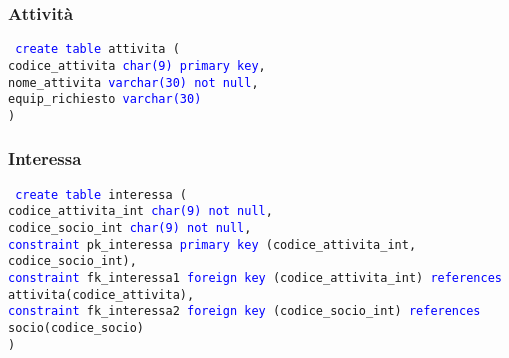 \documentclass{article}
\begin{document}
    \subsubsection{Attività}
    \begin{flushleft}
        \texttt{
        \textcolor{blue}{create table} attivita ( \\
        \hspace*{2em} codice\_attivita \hspace*{2em} \textcolor{blue}{char(9)} \hspace*{4em} \textcolor{blue}{primary key}, \\
        \hspace*{2em} nome\_attivita \hspace*{2.9em} \textcolor{blue}{varchar(30)} \hspace*{2.2em} \textcolor{blue}{not null}, \\
        \hspace*{2em} equip\_richiesto \hspace*{2em} \textcolor{blue}{varchar(30)} \\)}
    \end{flushleft}
    
    \newpage
    \subsubsection{Interessa}
    \begin{flushleft}
        \texttt{
        \textcolor{blue}{create table} interessa ( \\
        \hspace*{2em} codice\_attivita\_int \hspace*{1.7em} \textcolor{blue}{char(9)} \hspace*{3,4em} \textcolor{blue}{not null}, \\
        \hspace*{2em} codice\_socio\_int \hspace*{3.3em} \textcolor{blue}{char(9)} \hspace*{3,4em} \textcolor{blue}{not null}, \\
        \hspace*{2em} \textcolor{blue}{constraint} pk\_interessa \textcolor{blue}{primary key} (codice\_attivita\_int, codice\_socio\_int), \\
        \hspace*{2em} \textcolor{blue}{constraint} fk\_interessa1 \textcolor{blue}{foreign key} (codice\_attivita\_int) \textcolor{blue}{references} \hspace*{2em} attivita(codice\_attivita), \\
        \hspace*{2em} \textcolor{blue}{constraint} fk\_interessa2 \textcolor{blue}{foreign key} (codice\_socio\_int) \textcolor{blue}{references} \hspace*{2em} socio(codice\_socio) \\)}
    \end{flushleft}
\end{document}
